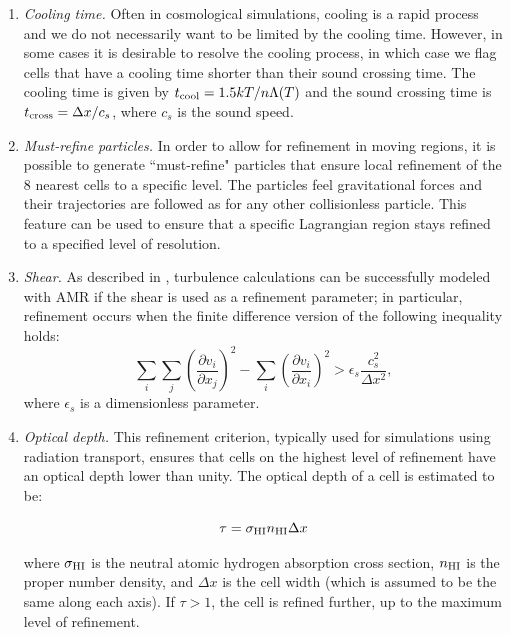 \begin{enumerate}
\item{\em Cooling time.}  Often in cosmological simulations, cooling is a rapid process and we do not necessarily want to be limited by the cooling time.  However, in some cases it is desirable to resolve the cooling process, in which case we flag cells that have a cooling time shorter than their sound crossing time.  The cooling time is given by $t_{\rm cool} = 1.5 kT / n \Lambda(T)$ and the sound crossing time is $t_{\rm cross} = \Delta x / c_s$, where $c_s$ is the sound speed.

\item{\em Must-refine particles.}  In order to allow for refinement in moving regions, it is possible to generate ``must-refine" particles that ensure local refinement of the 8 nearest cells to a specific level.  The particles feel gravitational forces and their trajectories are followed as for any other collisionless particle.  This feature can be used to ensure that a specific Lagrangian region stays refined to a specified level of resolution. 

\item{\em Shear.} As described in \citet{Kritsuk06}, turbulence calculations can be successfully modeled with AMR if the shear is used as a refinement parameter; in particular, refinement occurs when the finite difference version of the following inequality holds:
\begin{equation}
\sum_i \sum_j \left( \frac{\partial v_i}{\partial x_j} \right)^2 -  \sum_i \left( \frac{\partial v_i}{\partial x_i} \right)^2
> \epsilon_s \frac{c_s^2}{\Delta x^2},
\end{equation}
where $\epsilon_s$ is a dimensionless parameter.

\item{\em Optical depth.} This refinement criterion, typically used for simulations using radiation transport, ensures that cells on the highest level of refinement have an  optical depth lower than unity.  The optical depth of a cell is estimated to be:

\begin{equation}
\tau = \sigma_{\rm HI} n_{\rm HI} \Delta x 
\end{equation}

where $\sigma_{\rm HI}$ is the neutral atomic hydrogen absorption
cross section, $n_{\rm HI}$ is the proper  number density,
and $\Delta x$ is the cell width (which is assumed to be the same along each axis).  If $\tau > 1$, the cell is refined
further, up to the maximum level of refinement.


\end{enumerate}

